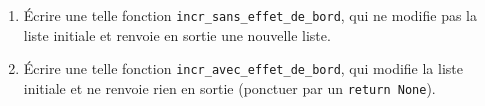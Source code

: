 \exer{}
\setcounter{numques}{0}

\begin{enumerate}[label=\emph{\alph*)}]
  \item \'Ecrire une telle fonction \texttt{incr\_sans\_effet\_de\_bord}, qui ne modifie pas la liste initiale et renvoie en sortie une nouvelle liste.
  \item \'Ecrire une telle fonction \texttt{incr\_avec\_effet\_de\_bord}, qui modifie la liste initiale et ne renvoie rien en sortie (ponctuer par un \texttt{return None}).
\end{enumerate}